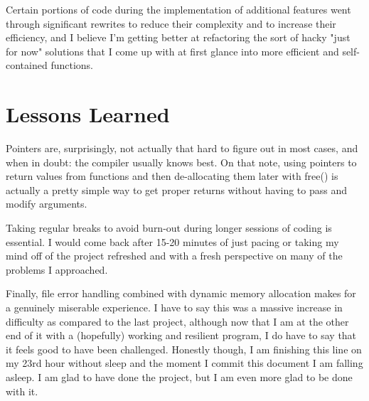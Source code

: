 \documentclass[11pt]{report}
\begin{document}
Certain portions of code during the implementation of additional features went through significant rewrites to reduce their complexity and to increase their efficiency, and I believe I'm getting better at refactoring the sort of hacky "just for now" solutions that I come up with at first glance into more efficient and self-contained functions.
\section*{Lessons Learned}
Pointers are, surprisingly, not actually that hard to figure out in most cases, and when in doubt: the compiler usually knows best. On that note, using pointers to return values from functions and then de-allocating them later with free() is actually a pretty simple way to get proper returns without having to pass and modify arguments.

Taking regular breaks to avoid burn-out during longer sessions of coding is essential. I would come back after 15-20 minutes of just pacing or taking my mind off of the project refreshed and with a fresh perspective on many of the problems I approached.

Finally, file error handling combined with dynamic memory allocation makes for a genuinely miserable experience. I have to say this was a massive increase in difficulty as compared to the last project, although now that I am at the other end of it with a (hopefully) working and resilient program, I do have to say that it feels good to have been challenged. Honestly though, I am finishing this line on my 23rd hour without sleep and the moment I commit this document I am falling asleep. I am glad to have done the project, but I am even more glad to be done with it.
\end{document}
